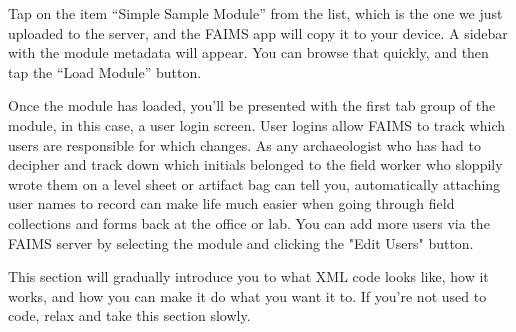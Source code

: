 {}

Tap on the item “Simple Sample Module” from the list, which is the one we just uploaded to the server, and the FAIMS app will copy it to your device. A sidebar with the module metadata will appear. You can browse that quickly, and then tap the “Load Module” button.

{}

Once the module has loaded, you'll be presented with the first tab group of the module, in this case, a user login screen. User logins allow FAIMS to track which users are responsible for which changes. As any archaeologist who has had to decipher and track down which initials belonged to the field worker who sloppily wrote them on a level sheet or artifact bag can tell you, automatically attaching user names to record can make life much easier when going through field collections and forms back at the office or lab. You can add more users via the FAIMS server by selecting the module and clicking the "Edit Users" button.

{}

{}





This section will gradually introduce you to what XML code looks like, how it works, and how you can make it do what you want it to. If you're not used to code, relax and take this section slowly.

